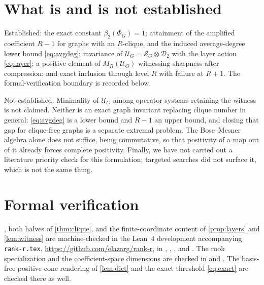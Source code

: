 \documentclass[11pt,reqno]{amsart}
\theoremstyle{plain}
\theoremstyle{remark}
\newcommand{\cS}{\mathcal S}
\newcommand{\cU}{\mathcal U}
\newcommand{\cD}{\mathcal D}
\begin{document}
\section*{What is and is not established}

Established: the exact constant $\beta_2(\Phi_G)=1$; attainment of the
amplified coefficient $R-1$ for graphs with an $R$-clique, and the induced
average-degree lower bound \cref{eq:avgdeg}; invariance of
$\cU_G=\cS_G\otimes\cD_2$ with the layer action \cref{eq:layer}; a positive
element of $M_R(\cU_G)$ witnessing sharpness after compression; and exact
inclusion through level $R$ with failure at $R+1$.  The formal-verification
boundary is recorded below.

Not established.  Minimality of $\cU_G$ among operator systems retaining the
witness is not claimed.  Neither is an exact graph invariant replacing clique
number in general: \cref{eq:avgdeg} is a lower bound and $R-1$ an upper bound,
and closing that gap for clique-free graphs is a separate extremal problem.
The Bose--Mesner algebra alone does not suffice, being commutative, so that
positivity of a map out of it already forces complete positivity.  Finally, we
have not carried out a literature priority check for this formulation; targeted
searches did not surface it, which is not the same thing.

\section*{Formal verification}

, both halves of \cref{thm:clique}, and the finite-coordinate
content of \cref{prop:layers} and \cref{lem:witness} are machine-checked in the
Lean~4 development accompanying \texttt{rank-r.tex},
\url{https://github.com/elazarg/rank-r}, in
,
,
, and
.
The rook specialization and the coefficient-space dimensions are checked in
 and
.  The basis-free
positive-cone rendering of
\cref{lem:dict} and the exact threshold \cref{eq:exact} are checked there as
well.
\end{document}

